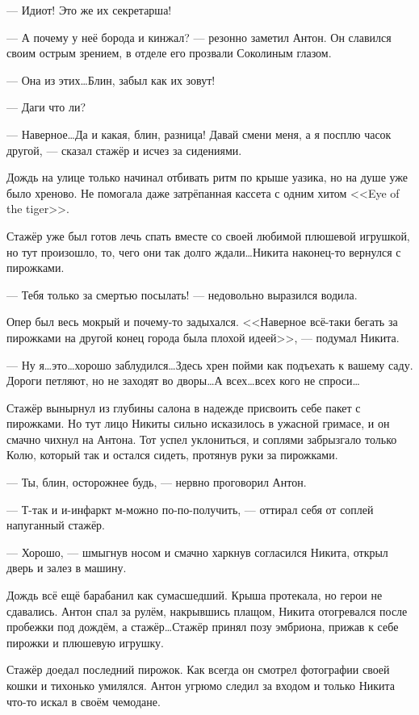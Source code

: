 --- Идиот! Это же их секретарша!

--- А почему у неё борода и кинжал? --- резонно заметил Антон. Он славился своим острым зрением, в отделе его прозвали Соколиным глазом.

--- Она из этих\ldots Блин, забыл как их зовут!

--- Даги что ли?

--- Наверное\ldots Да и какая, блин, разница! Давай смени меня, а я посплю часок другой, --- сказал стажёр и исчез за сидениями.

Дождь на улице только начинал отбивать ритм по крыше уазика, но на душе уже было хреново. Не помогала даже затрёпанная кассета с одним хитом <<Eye of the tiger>>.

Стажёр уже был готов лечь спать вместе со своей любимой плюшевой игрушкой, но тут произошло, то, чего они так долго ждали\ldots Никита наконец-то вернулся с пирожками.

--- Тебя только за смертью посылать! --- недовольно выразился водила.

Опер был весь мокрый и почему-то задыхался. <<Наверное всё-таки бегать за пирожками на другой конец города была плохой идеей>>, --- подумал Никита.

--- Ну я\ldots это\ldots хорошо заблудился\ldots Здесь хрен пойми как подъехать к вашему саду. Дороги петляют, но не заходят во дворы\ldots А всех\ldots всех кого не спроси\ldots

Стажёр вынырнул из глубины салона в надежде присвоить себе пакет с пирожками. Но тут лицо Никиты сильно исказилось в ужасной гримасе, и он смачно чихнул на Антона. Тот успел уклониться, и соплями забрызгало только Колю, который так и остался сидеть, протянув руки за пирожками.

--- Ты, блин, осторожнее будь, --- нервно проговорил Антон. 

--- Т-так и и-инфаркт м-можно по-по-получить, --- оттирал себя от соплей напуганный стажёр. 

--- Хорошо, --- шмыгнув носом и смачно харкнув согласился Никита, открыл дверь и залез в машину.

Дождь всё ещё барабанил как сумасшедший. Крыша протекала, но герои не сдавались. Антон спал за рулём, накрывшись плащом, Никита отогревался после пробежки под дождём, а стажёр\ldots Стажёр принял позу эмбриона, прижав к себе пирожки и плюшевую игрушку.

\asterisks

Стажёр доедал последний пирожок. Как всегда он смотрел фотографии своей кошки и тихонько умилялся. Антон угрюмо следил за входом и только Никита что-то искал в своём чемодане.

